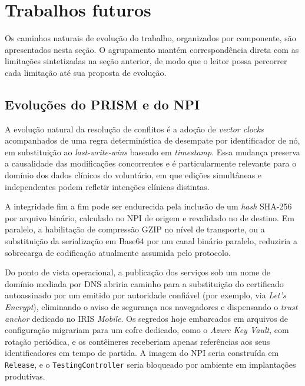 \section{Trabalhos futuros}\label{sec:trabalhosFuturos}

Os caminhos naturais de evolução do trabalho, organizados por componente, são apresentados nesta seção. O agrupamento mantém correspondência direta com as limitações sintetizadas na seção anterior, de modo que o leitor possa percorrer cada limitação até sua proposta de evolução.

\subsection{Evoluções do PRISM e do NPI}\label{subsec:trabalhosFuturosPrism}

A evolução natural da resolução de conflitos é a adoção de \textit{vector clocks} \cite{fidge1988timestamps} acompanhados de uma regra determinística de desempate por identificador de nó, em substituição ao \textit{last-write-wins} baseado em \textit{timestamp}. Essa mudança preserva a causalidade das modificações concorrentes e é particularmente relevante para o domínio dos dados clínicos do voluntário, em que edições simultâneas e independentes podem refletir intenções clínicas distintas.

A integridade fim a fim pode ser endurecida pela inclusão de um \textit{hash} SHA-256 por arquivo binário, calculado no NPI de origem e revalidado no de destino. Em paralelo, a habilitação de compressão GZIP no nível de transporte, ou a substituição da serialização em Base64 por um canal binário paralelo, reduziria a sobrecarga de codificação atualmente assumida pelo protocolo.

Do ponto de vista operacional, a publicação dos serviços sob um nome de domínio mediada por DNS abriria caminho para a substituição do certificado autoassinado por um emitido por autoridade confiável (por exemplo, via \textit{Let's Encrypt}), eliminando o aviso de segurança nos navegadores e dispensando o \textit{trust anchor} dedicado no IRIS \textit{Mobile}. Os segredos hoje embarcados em arquivos de configuração migrariam para um cofre dedicado, como o \textit{Azure Key Vault}, com rotação periódica, e os contêineres receberiam apenas referências aos seus identificadores em tempo de partida. A imagem do NPI seria construída em \texttt{Release}, e o \texttt{TestingController} seria bloqueado por ambiente em implantações produtivas.

